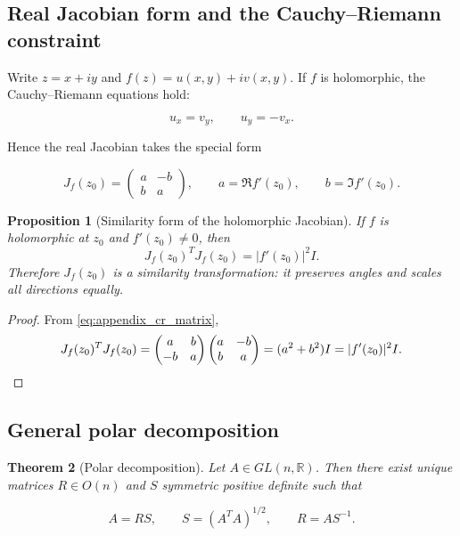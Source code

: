 \documentclass[11pt, a4paper]{article}
\theoremstyle{plain}
\newtheorem{theorem}{Theorem}[section]
\newtheorem{proposition}[theorem]{Proposition}
\theoremstyle{definition}
\theoremstyle{remark}
\begin{document}
\subsection{Real Jacobian form and the Cauchy--Riemann constraint}

Write $z=x+iy$ and $f(z)=u(x,y)+iv(x,y)$.
If $f$ is holomorphic, the Cauchy--Riemann equations hold:

\begin{equation}
u_x=v_y, \qquad u_y=-v_x.
\end{equation}

Hence the real Jacobian takes the special form

\begin{equation}
J_f(z_0)=
\begin{pmatrix}
a & -b \\
b & a
\end{pmatrix},
\qquad
a=\Re f'(z_0),
\qquad
b=\Im f'(z_0).
\label{eq:appendix_cr_matrix}
\end{equation}

\begin{proposition}[Similarity form of the holomorphic Jacobian]
If $f$ is holomorphic at $z_0$ and $f'(z_0)\neq 0$, then
\[
J_f(z_0)^T J_f(z_0)=|f'(z_0)|^2 I.
\]
Therefore $J_f(z_0)$ is a similarity transformation: it preserves angles and scales
all directions equally.
\end{proposition}

\begin{proof}
From \eqref{eq:appendix_cr_matrix},
\[
J_f(z_0)^T J_f(z_0)
=
\begin{pmatrix}a & b\\-b & a\end{pmatrix}
\begin{pmatrix}a & -b\\b & a\end{pmatrix}
=
(a^2+b^2)I
=
|f'(z_0)|^2 I.
\qedhere
\]
\end{proof}

\subsection{General polar decomposition}

\begin{theorem}[Polar decomposition]
Let $A\in GL(n,\mathbb{R})$. Then there exist unique matrices
$R\in O(n)$ and $S$ symmetric positive definite such that

\begin{equation}
A=RS,
\qquad
S=(A^T A)^{1/2},
\qquad
R=A S^{-1}.
\end{equation}
\end{theorem}
\end{document}
